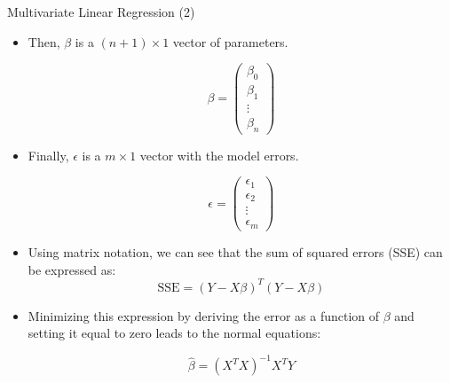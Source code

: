 \documentclass[handout]{beamer}
\begin{document}
\begin{frame}{Multivariate Linear Regression (2)}
\scriptsize{
\begin{itemize}
 \item Then, $\beta$ is a $(n+1) \times 1$ vector of parameters.

\begin{displaymath}
 \beta =
 \begin{pmatrix}
  \beta_{0}  \\
  \beta_{1}  \\
  \vdots    \\
  \beta_{n} 
 \end{pmatrix}
\end{displaymath}


\item Finally, $\epsilon$  is a $m \times 1$ vector with the model errors. 

\begin{displaymath}
 \epsilon =
 \begin{pmatrix}
  \epsilon_{1}  \\
  \epsilon_{2}  \\
  \vdots    \\
  \epsilon_{m} 
 \end{pmatrix}
\end{displaymath}

\item  Using matrix notation, we can see that the sum of squared errors (SSE) can be expressed as:
\begin{displaymath}
 \text{SSE} = (Y - X\beta)^{T}(Y-X\beta)
\end{displaymath}

\item Minimizing this expression by deriving the error as a function of $\beta$ and setting it equal to zero leads to the normal equations:

\begin{displaymath}
   \hat{\beta} = (X^{T}X)^{-1} X^{T}Y
\end{displaymath}


\end{itemize}


}

\end{frame}
\end{document}

